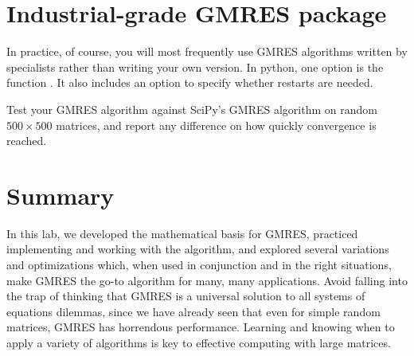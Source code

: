 \section*{Industrial-grade GMRES package}
In practice, of course, you will most frequently use GMRES algorithms written by specialists rather than writing your own version.
In python, one option is the function .
It also includes an option to specify whether restarts are needed.

\begin{problem}
Test your GMRES algorithm against SciPy's GMRES algorithm on random $500\times 500$ matrices, and report any difference on how quickly convergence is reached.
\label{prob:GMRES4}
\end{problem}

\section*{Summary}
In this lab, we developed the mathematical basis for GMRES, practiced implementing and working with the algorithm, and explored several variations and optimizations which, when used in conjunction and in the right situations, make GMRES the go-to algorithm for many, many applications.
Avoid falling into the trap of thinking that GMRES is a universal solution to all systems of equations dilemmas, since we have already seen that even for simple random matrices, GMRES has horrendous performance.
Learning and knowing when to apply a variety of algorithms is key to effective computing with large matrices.
